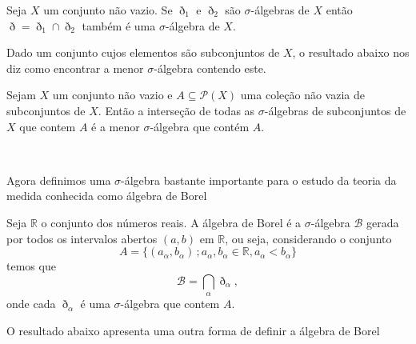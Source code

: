 \documentclass[a4paper, 11pt]{book}
\theoremstyle{definition}
\newcommand{\bR}{\mathbb{R}}
\newcommand{\cB}{\mathcal{B}}
\begin{document}
\begin{ex}
    Seja $X$ um conjunto não vazio. Se $\eth_1$ e $\eth_2$ são $\sigma$-álgebras de $X$ então $\eth = \eth_1 \cap \eth_2$ também é uma $\sigma$-álgebra de $X$.
\end{ex}

Dado um conjunto cujos elementos são subconjuntos de $X$, o resultado abaixo nos diz como encontrar a menor $\sigma$-álgebra contendo este.

\begin{pbox}
    Sejam $X$ um conjunto não vazio e $A \subseteq \mathcal{P}(X)$ uma coleção não vazia de subconjuntos de $X$. Então a interseção de todas as $\sigma$-álgebras de subconjuntos de $X$ que contem $A$ é a menor $\sigma$-álgebra que contém $A$.
\end{pbox}
\begin{prf}
    ~
\end{prf}

Agora definimos uma $\sigma$-álgebra bastante importante para o estudo da teoria da medida conhecida como álgebra de Borel

\begin{dbox}
    Seja $\bR$ o conjunto dos números reais. A álgebra de Borel é a $\sigma$-álgebra $\cB$ gerada por todos os intervalos abertos $(a,b)$ em $\bR$, ou seja, considerando o conjunto
    \[
        A = \{(a_\alpha, b_\alpha) \,; a_\alpha, b_\alpha \in \bR, a_\alpha < b_\alpha\}  
    \]
    temos que
    \[
        \cB = \bigcap_\alpha \eth_\alpha,
    \]
    onde cada $\eth_\alpha$ é uma $\sigma$-álgebra que contem $A$.
\end{dbox}

O resultado abaixo apresenta uma outra forma de definir a álgebra de Borel



    
\end{document}
